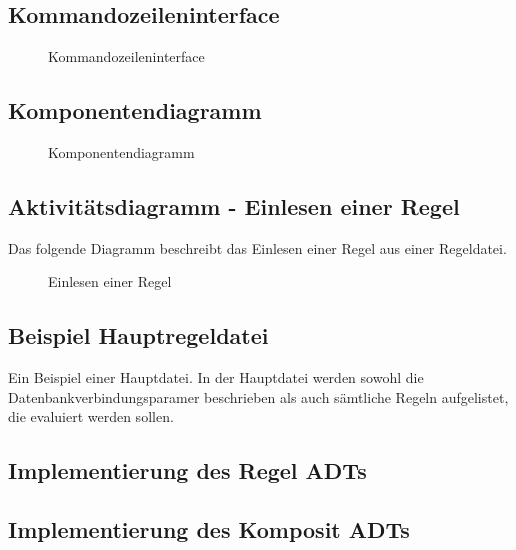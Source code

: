 \subsection{Kommandozeileninterface}
\label{app:cli}
\begin{figure}[htb]
\centering
{}
\caption{Kommandozeileninterface}
\end{figure}
\clearpage

\subsection{Komponentendiagramm}
\label{app:Komponentendiagramm}
\begin{figure}[htb]
\centering
{}
\caption{Komponentendiagramm}
\end{figure}
\clearpage

\subsection{Aktivitätsdiagramm - Einlesen einer Regel}
\label{app:AktivitaetRegelEinlesen}
Das folgende Diagramm beschreibt das Einlesen einer Regel aus einer Regeldatei.
\begin{figure}[htb]
\centering
{}
\caption{Einlesen einer Regel}
\end{figure}
\clearpage

\subsection{Beispiel Hauptregeldatei}
\label{app:MasterDatei}
Ein Beispiel einer Hauptdatei. In der Hauptdatei werden sowohl die Datenbankverbindungsparamer beschrieben als auch sämtliche Regeln aufgelistet, die evaluiert werden sollen.


\subsection{Implementierung des Regel \acs{ADT}s}
\label{app:RegelADT}

\clearpage

\subsection{Implementierung des Komposit \acs{ADT}s}
\label{app:CompositeADT}



